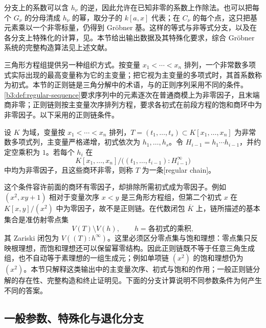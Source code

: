 \ProseParagraphBreak
分支上的系数可以含 \(h_\nu\) 的逆，因此允许在已知非零的系数上作除法。也可以把每个 \(G_\nu\) 的分母清成 \(h_\nu\) 的幂，取分子的 \(k[a,x]\) 代表；在 \(C_\nu\) 的每个点，这只把基元素乘以一个非零标量，仍得到 Gröbner 基。这样的等式与非等式分支，以及在各分支上特殊化的计算，见\cite[\S\S6--7]{Montes2002ParametricGroebner}。本节给出输出数据及其特殊化要求，综合 Gröbner 系统的完整构造算法见上述文献。

\ProseParagraphBreak
三角形方程组提供另一种组织方式。按变量 \(x_1<\cdots<x_n\) 排列，一个非常数多项式实际出现的最高变量称为它的主变量；把它视为主变量的多项式时，其首系数称为初式。本节的正则链是三角分解中的术语，与的正则序列采用不同的条件。\cref{b3:def:regular-sequence}要求序列中的元素逐次在普通商模上为非零因子，且末端商非零；正则链则按主变量次序排列方程，要求各初式在前段方程的饱和商环中为非零因子。以下采用\cite[\S5.2, Definition 5.7]{Hubert2003PolynomialSystems}的正则链条件。

\begin{definition}\label{b3:def:B-regular-chain}
	设 \(K\) 为域，变量按 \(x_1<\cdots<x_n\) 排列，\(T=(t_1,\ldots,t_s)\subset K[x_1,\ldots,x_n]\) 为非常数多项式列，主变量严格递增，初式依次为 \(h_1,\ldots,h_s\)。令 \(H_{i-1}=h_1\cdots h_{i-1}\)，并约定空乘积为 \(1\)。若每个 \(h_i\) 在
	\[
		K[x_1,\ldots,x_n]/ \bigl((t_1,\ldots,t_{i-1}):H_{i-1}^{\infty}\bigr)
	\]
	中均为非零因子，且这些商环非零，则称 \(T\) 为一条[regular chain]。
\end{definition}

这个条件容许前面的商环有零因子，却排除所需初式成为零因子。例如 \((x^2,xy+1)\) 相对于变量次序 \(x<y\) 是三角形方程组，但第二个初式 \(x\) 在 \(K[x,y]/(x^2)\) 中为零因子，故不是正则链。在代数闭包 \(\overline K\) 上，链所描述的基本集合是准仿射零点集
\[
	V(T)\setminus V(h),\qquad h=\text{各初式的乘积},
\]
其 Zariski 闭包为 \(V((T):h^\infty)\)。这里必须区分零点集与饱和理想：零点集只反映根理想，而饱和理想还可以保留幂零结构。因此正则链既不等于任意三角生成组，也不自动等于素理想的一组生成元；例如单项链 \((x^2)\) 的饱和理想仍为 \((x^2)\)。本节只解释这类输出中的主变量次序、初式与饱和的作用；一般正则链分解的存在性、完整构造和终止证明见\cite[\S\S8--9]{Hubert2003PolynomialSystems}。下面的分支计算说明不同参数条件为何产生不同的答案。

\subsection{一般参数、特殊化与退化分支}
\label{b3:subsec:B03:03}

